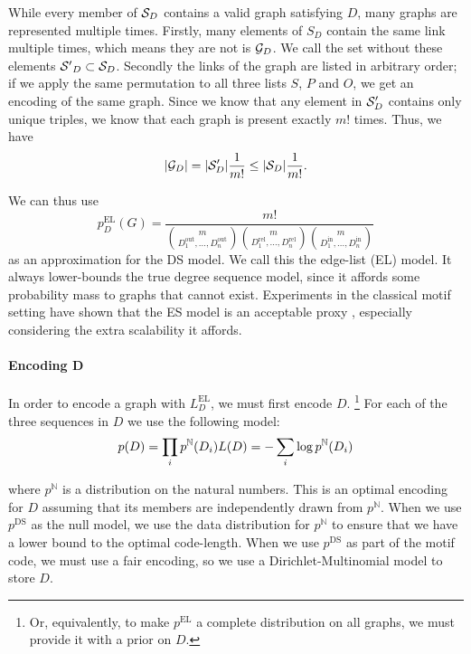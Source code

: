 \documentclass[11pt]{article}
\newcommand{\N}{{\mathbb N}}
\newcommand{\G}{{\cal G}}
\begin{document}
While every member of ${\cal S}_D$ contains a valid graph satisfying $D$, many graphs are represented multiple times. Firstly, many elements of ${S}_D$ contain the same link multiple times, which means they are not is ${\cal G}_D$. We call the set without these elements ${\cal S'}_D \subset {\cal S}_D$. Secondly the links of the graph are listed in arbitrary order; if we apply the same permutation to all three lists $S$, $P$ and $O$, we get an encoding of the same graph. Since we know that any element in ${\cal S}'_D$ contains only unique triples, we know that each graph is present exactly $m!$ times. Thus, we have
\[
|\G_D| = |{\cal S}'_D| \frac{1}{m!} \leq  |{\cal S}_D| \frac{1}{m!} \text{.}
\]

We can thus use 
\[
p^\text{EL}_D(G) =  \frac{m!}{{m \choose {D_1^\text{out}, \ldots, D_n^\text{out}} }
 {m \choose {D_1^\text{rel}, \ldots, D_n^\text{rel}} }
 {m \choose {D_1^\text{in}, \ldots, D_n^\text{in}} }}
\]
as an approximation for the DS model. We call this the edge-list (EL) model. It always lower-bounds the true degree sequence model, since it affords some probability mass to graphs that cannot exist. \footnotemark Experiments in the classical motif setting have shown that the ES model is an acceptable proxy \cite{bloem2017large}, especially considering the extra scalability it affords.

 
 \paragraph{Encoding D} In order to encode a graph with $L^\text{EL}_D$, we must first encode $D$. \footnote{Or, equivalently, to make $p^\text{EL}$ a complete distribution on all graphs, we must provide it with a prior on $D$.} For each of the three sequences in $D$ we use the following model:
\[
 p(D) = \prod_i p^{\N}(D_i) \\
 L(D) = - \sum_i \log p^{\N}(D_i)
\]

where $p^{\N}$ is a distribution on the natural numbers. This is an optimal encoding for $D$ assuming that its members are independently drawn from $p^{\N}$. When we use $p^\text{DS}$ as the null model, we use the data distribution for $p^{\N}$ to ensure that we have a lower bound to the optimal code-length. When we use $p^\text{DS}$ as part of the motif code, we must use a fair encoding, so we use a Dirichlet-Multinomial model to store $D$.
 
\end{document}

